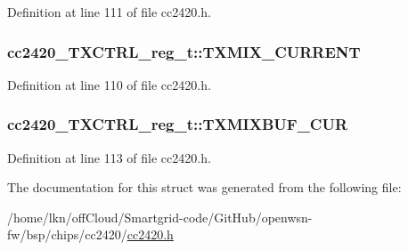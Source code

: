 Definition at line 111 of file cc2420.\+h.

\subsubsection[{\texorpdfstring{T\+X\+M\+I\+X\+\_\+\+C\+U\+R\+R\+E\+NT}{TXMIX_CURRENT}}]{ cc2420\+\_\+\+T\+X\+C\+T\+R\+L\+\_\+reg\+\_\+t\+::\+T\+X\+M\+I\+X\+\_\+\+C\+U\+R\+R\+E\+NT}\hypertarget{structcc2420___t_x_c_t_r_l__reg__t_a571333a0ec256e9636d6a26e114837c3}{}\label{structcc2420___t_x_c_t_r_l__reg__t_a571333a0ec256e9636d6a26e114837c3}


Definition at line 110 of file cc2420.\+h.

\subsubsection[{\texorpdfstring{T\+X\+M\+I\+X\+B\+U\+F\+\_\+\+C\+UR}{TXMIXBUF_CUR}}]{ cc2420\+\_\+\+T\+X\+C\+T\+R\+L\+\_\+reg\+\_\+t\+::\+T\+X\+M\+I\+X\+B\+U\+F\+\_\+\+C\+UR}\hypertarget{structcc2420___t_x_c_t_r_l__reg__t_a797f907eb57c0f87f65be4db3dc01c1c}{}\label{structcc2420___t_x_c_t_r_l__reg__t_a797f907eb57c0f87f65be4db3dc01c1c}


Definition at line 113 of file cc2420.\+h.



The documentation for this struct was generated from the following file\+:\begin{DoxyCompactItemize}
\item 
/home/lkn/off\+Cloud/\+Smartgrid-\/code/\+Git\+Hub/openwsn-\/fw/bsp/chips/cc2420/\hyperlink{cc2420_8h}{cc2420.\+h}\end{DoxyCompactItemize}
